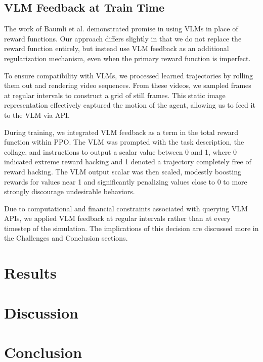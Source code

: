 \documentclass{article}
\begin{document}
\subsection{VLM Feedback at Train Time}
The work of Baumli et al. \cite{baumli2024visionlanguagemodelssourcerewards} demonstrated promise in using VLMs in place of reward functions. Our approach differs slightly in that we do not replace the reward function entirely, but instead use VLM feedback as an additional regularization mechanism, even when the primary reward function is imperfect.

To ensure compatibility with VLMs, we processed learned trajectories by rolling them out and rendering video sequences. From these videos, we sampled frames at regular intervals to construct a grid of still frames. This static image representation effectively captured the motion of the agent, allowing us to feed it to the VLM via API. 

During training, we integrated VLM feedback as a term in the total reward function within PPO. The VLM was prompted with the task description, the collage, and instructions to output a scalar value between 0 and 1, where 0 indicated extreme reward hacking and 1 denoted a trajectory completely free of reward hacking. The VLM output scalar was then scaled, modestly boosting rewards for values near 1 and significantly penalizing values close to 0 to more strongly discourage undesirable behaviors. 

Due to computational and financial constraints associated with querying VLM APIs, we applied VLM feedback at regular intervals rather than at every timestep of the simulation. The implications of this decision are discussed more in the Challenges and Conclusion sections.

\section{Results}

\section{Discussion}

\section{Conclusion}

\end{document}
